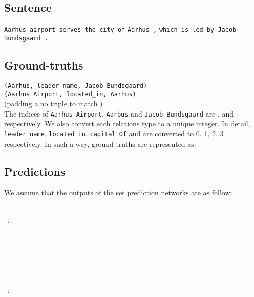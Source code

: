 \documentclass[letterpaper]{article} \usepackage{aaai21}  \usepackage{times}  \usepackage{helvet} \usepackage{courier}  \usepackage[hyphens]{url}  \usepackage{graphicx} \usepackage{amsfonts,amssymb}
\begin{document}
\subsection{Sentence}
\texttt{Aarhus airport serves the city of} \texttt{Aarhus ,}  \texttt{which is led by Jacob Bundsgaard .}
\\

\subsection{Ground-truths}
\texttt{(Aarhus, leader\_name, Jacob Bundsgaard)} \\
\texttt{(Aarhus Airport, located\_in, Aarhus)} \\
 (padding a no triple to match ) \\

\noindent The indices of \texttt{Aarhus Airport}, \texttt{Aarbus} and \texttt{Jacob Bundsgaard} are ,  and  respectively. We also convert each relations type to a unique integer. In detail, \texttt{leader\_name}, \texttt{located\_in},  \texttt{capital\_Of} and   are converted to 0, 1, 2, 3 respectively. In such a way, ground-truths are represented as: \\


\subsection{Predictions}

We assume that the outputs of the set prediction networks are as follow: 

\noindent  \\
\indent \quad \quad  \quad   \quad\, :
\\
\indent \quad \quad   \\
\indent \quad \quad  \\
\indent \quad \quad   \\
\indent \quad \quad \\
\indent \ \ \ \ \ \ \   \\

\noindent  \\
\indent \quad \quad   \quad   \quad\, :
\\
\indent \quad \quad   \\
\indent \quad \quad  \\
\indent \quad \quad   \\
\indent \quad \quad  \\
\indent \ \ \ \ \ \ \   \\
\end{document}
